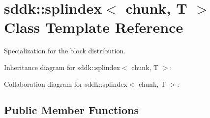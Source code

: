 \hypertarget{classsddk_1_1splindex_3_01chunk_00_01_t_01_4}{}\section{sddk\+:\+:splindex$<$ chunk, T $>$ Class Template Reference}
\label{classsddk_1_1splindex_3_01chunk_00_01_t_01_4}


Specialization for the block distribution.  




Inheritance diagram for sddk\+:\+:splindex$<$ chunk, T $>$\+:


Collaboration diagram for sddk\+:\+:splindex$<$ chunk, T $>$\+:
\subsection*{Public Member Functions}
